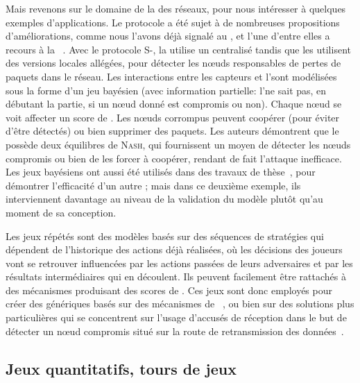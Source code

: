 Mais revenons sur le domaine de la \secu des réseaux, pour nous intéresser à quelques exemples d'applications.
Le protocole \leach a été sujet à de nombreuses propositions d'améliorations, comme nous l'avons déjà signalé au , et l'une d'entre elles a recours à la ~\cite{MMZ09}.
Avec le protocole S-\leach, la \sdb utilise un \ids centralisé tandis que les \chs utilisent des versions locales allégées, pour détecter les nœuds responsables de pertes de paquets dans le réseau.
Les interactions entre les capteurs et l'\IDS sont modélisées sous la forme d'un jeu bayésien (\cad avec information partielle: l'\IDS ne sait pas, en débutant la partie, si un nœud donné est compromis ou non).
Chaque nœud se voit affecter un score de \reput.
Les nœuds corrompus peuvent coopérer (pour éviter d'être détectés) ou bien supprimer des paquets.
Les auteurs démontrent que le  possède deux équilibres de \textsc{Nash}, qui fournissent un moyen de détecter les nœuds compromis ou bien de les forcer à coopérer, rendant de fait l'attaque inefficace.
Les jeux bayésiens ont aussi été utilisés dans des travaux de thèse~\cite{Ham12}, pour démontrer l'efficacité d'un autre \ids; mais dans ce deuxième exemple, ils interviennent davantage au niveau de la validation \aposteriori du modèle plutôt qu'au moment de sa conception.

Les jeux répétés sont des modèles basés sur des séquences de stratégies qui dépendent de l'historique des actions déjà réalisées, où les décisions des joueurs vont se retrouver influencées par les actions passées de leurs adversaires et par les résultats intermédiaires qui en découlent.
Ils peuvent facilement être rattachés à des mécanismes produisant des scores de \reput.
Ces jeux sont donc employés pour créer des \idss génériques basés sur des mécanismes de ~\cite{AD07}, ou bien sur des solutions plus particulières qui se concentrent sur l'usage d'accusés de réception dans le but de détecter un nœud compromis situé sur la route de retransmission des données~\cite{Red09}.

\subsection{Jeux quantitatifs, tours de jeux}

